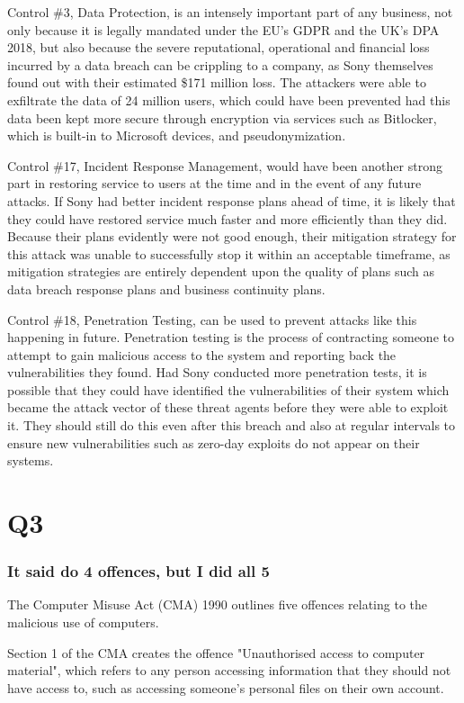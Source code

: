 \documentclass[12pt]{report}
\begin{document}
Control \#3, Data Protection, is an intensely important part of any business, not only because it is legally mandated under the EU's GDPR and the UK's DPA 2018, but also because the severe reputational, operational and financial loss incurred by a data breach can be crippling to a company, as Sony themselves found out with their estimated \$171 million loss. The attackers were able to exfiltrate the data of 24 million users, which could have been prevented had this data been kept more secure through encryption via services such as Bitlocker, which is built-in to Microsoft devices, and pseudonymization.

Control \#17, Incident Response Management, would have been another strong part in restoring service to users at the time and in the event of any future attacks. If Sony had better incident response plans ahead of time, it is likely that they could have restored service much faster and more efficiently than they did. Because their plans evidently were not good enough, their mitigation strategy for this attack was unable to successfully stop it within an acceptable timeframe, as mitigation strategies are entirely dependent upon the quality of plans such as data breach response plans and business continuity plans.

Control \#18, Penetration Testing, can be used to prevent attacks like this happening in future. Penetration testing is the process of contracting someone to attempt to gain malicious access to the system and reporting back the vulnerabilities they found. Had Sony conducted more penetration tests, it is possible that they could have identified the vulnerabilities of their system which became the attack vector of these threat agents before they were able to exploit it. They should still do this even after this breach and also at regular intervals to ensure new vulnerabilities such as zero-day exploits do not appear on their systems.

\section{Q3}
\subsubsection{It said do 4 offences, but I did all 5}
The Computer Misuse Act (CMA) 1990 outlines five offences relating to the malicious use of computers.

Section 1 of the CMA creates the offence "Unauthorised access to computer material", which refers to any person accessing information that they should not have access to, such as accessing someone's personal files on their own account. 
\end{document}
